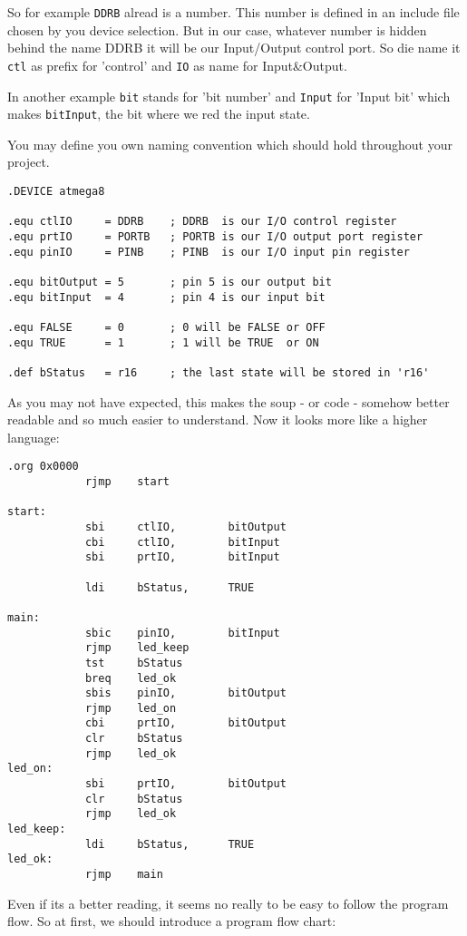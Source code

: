 So for example \texttt{DDRB} alread is a number. This number is defined in an include file chosen by you device selection. But in our case, whatever number is hidden behind the name DDRB it will be our Input/Output control port. So die name it \texttt{ctl} as prefix for 'control' and \texttt{IO} as name for Input\&Output.

In another example \texttt{bit} stands for 'bit number' and \texttt{Input} for 'Input bit' which makes \texttt{bitInput}, the bit where we red the input state.

You may define you own naming convention which should hold throughout your project.

\begin{lstlisting}
.DEVICE atmega8

.equ ctlIO     = DDRB    ; DDRB  is our I/O control register
.equ prtIO     = PORTB   ; PORTB is our I/O output port register
.equ pinIO     = PINB    ; PINB  is our I/O input pin register

.equ bitOutput = 5       ; pin 5 is our output bit
.equ bitInput  = 4       ; pin 4 is our input bit

.equ FALSE     = 0       ; 0 will be FALSE or OFF
.equ TRUE      = 1       ; 1 will be TRUE  or ON

.def bStatus   = r16     ; the last state will be stored in 'r16'
\end{lstlisting}

As you may not have expected, this makes the soup - or code - somehow better readable and so much easier to understand. Now it looks more like a higher language:

\begin{lstlisting}
.org 0x0000
            rjmp    start

start:
            sbi     ctlIO,        bitOutput
            cbi     ctlIO,        bitInput
            sbi     prtIO,        bitInput

            ldi     bStatus,      TRUE

main:
            sbic    pinIO,        bitInput
            rjmp    led_keep
            tst     bStatus
            breq    led_ok
            sbis    pinIO,        bitOutput
            rjmp    led_on
            cbi     prtIO,        bitOutput
            clr     bStatus
            rjmp    led_ok
led_on:
            sbi     prtIO,        bitOutput
            clr     bStatus
            rjmp    led_ok
led_keep:
            ldi     bStatus,      TRUE
led_ok:
            rjmp    main
\end{lstlisting}

Even if its a better reading, it seems no really to be easy to follow the program flow. So at first, we should introduce a program flow chart:


